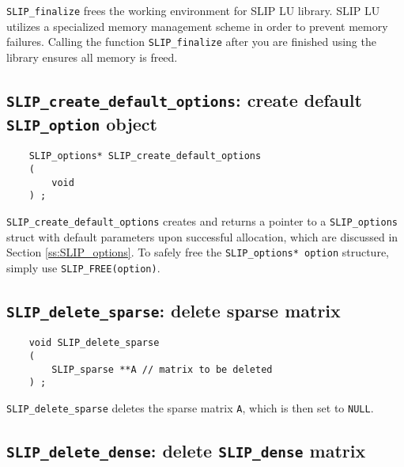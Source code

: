 \documentclass[12pt]{article}
\theoremstyle{definition}
\begin{document}
\verb|SLIP_finalize| frees the working environment for SLIP LU library. SLIP LU
utilizes a specialized memory management scheme in order to prevent memory
failures. Calling the function \verb|SLIP_finalize| after you are finished
using the library ensures all memory is freed.

\cprotect\subsection{\verb|SLIP_create_default_options|: create default \verb|SLIP_option| object}
\label{ss:create_default_options}

\begin{mdframed}[userdefinedwidth=6in]
{\footnotesize
\begin{verbatim}
    SLIP_options* SLIP_create_default_options
    (
        void
    ) ;
\end{verbatim}
} \end{mdframed}

\verb|SLIP_create_default_options| creates and returns a pointer to a
\verb|SLIP_options| struct with default parameters upon successful allocation,
which are discussed in Section \ref{ss:SLIP_options}.  To safely free the
\verb|SLIP_options* option| structure, simply use \verb|SLIP_FREE(option)|.

\cprotect\subsection{\verb|SLIP_delete_sparse|: delete sparse matrix}
\label{ss:delete_sparse}

\begin{mdframed}[userdefinedwidth=6in]
{\footnotesize
\begin{verbatim}
    void SLIP_delete_sparse
    (
        SLIP_sparse **A // matrix to be deleted
    ) ;
\end{verbatim}
} \end{mdframed}

\verb|SLIP_delete_sparse| deletes the sparse matrix \verb|A|,
which is then set to \verb|NULL|.

\cprotect\subsection{\verb|SLIP_delete_dense|: delete \verb'SLIP_dense' matrix}
\label{ss:delete_dense}
\end{document}
